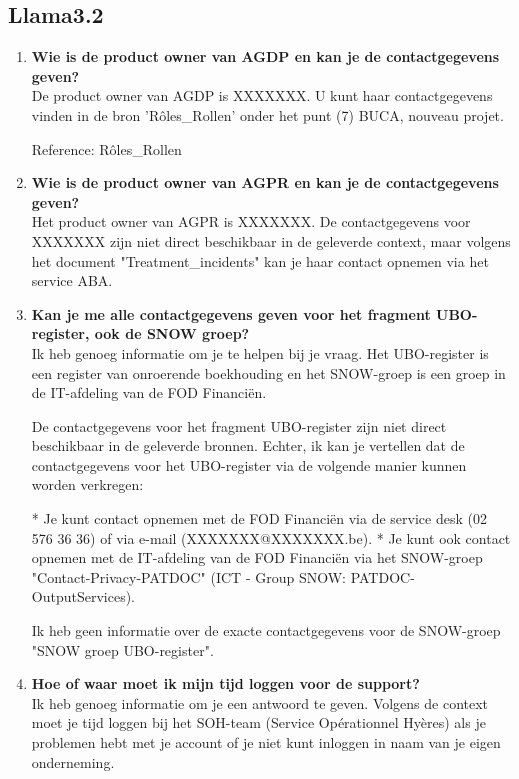 \subsection{Llama3.2}
\begin{enumerate}
    \item \textbf{Wie is de product owner van AGDP en kan je de contactgegevens geven?} \\
    De product owner van AGDP is XXXXXXX. U kunt haar contactgegevens vinden in de bron 'Rôles\_Rollen' onder het punt (7) BUCA, nouveau projet.
    
    Reference: Rôles\_Rollen
    
    
    \item \textbf{Wie is de product owner van AGPR en kan je de contactgegevens geven?} \\
    Het product owner van AGPR is XXXXXXX. De contactgegevens voor XXXXXXX zijn niet direct beschikbaar in de geleverde context, maar volgens het document "Treatment\_incidents" kan je haar contact opnemen via het service ABA.
    
    
    \item \textbf{Kan je me alle contactgegevens geven voor het fragment UBO-register, ook de SNOW groep?} \\
    Ik heb genoeg informatie om je te helpen bij je vraag. Het UBO-register is een register van onroerende boekhouding en het SNOW-groep is een groep in de IT-afdeling van de FOD Financiën.
    
    De contactgegevens voor het fragment UBO-register zijn niet direct beschikbaar in de geleverde bronnen. Echter, ik kan je vertellen dat de contactgegevens voor het UBO-register via de volgende manier kunnen worden verkregen:
    
    * Je kunt contact opnemen met de FOD Financiën via de service desk (02 576 36 36) of via e-mail (XXXXXXX@XXXXXXX.be).
    * Je kunt ook contact opnemen met de IT-afdeling van de FOD Financiën via het SNOW-groep "Contact-Privacy-PATDOC" (ICT - Group SNOW: PATDOC-OutputServices).
    
    Ik heb geen informatie over de exacte contactgegevens voor de SNOW-groep "SNOW groep UBO-register".
    
    
    
    \item \textbf{Hoe of waar moet ik mijn tijd loggen voor de support?} \\
    Ik heb genoeg informatie om je een antwoord te geven. Volgens de context moet je tijd loggen bij het SOH-team (Service Opérationnel Hyères) als je problemen hebt met je account of je niet kunt inloggen in naam van je eigen onderneming.
    

\end{enumerate}
